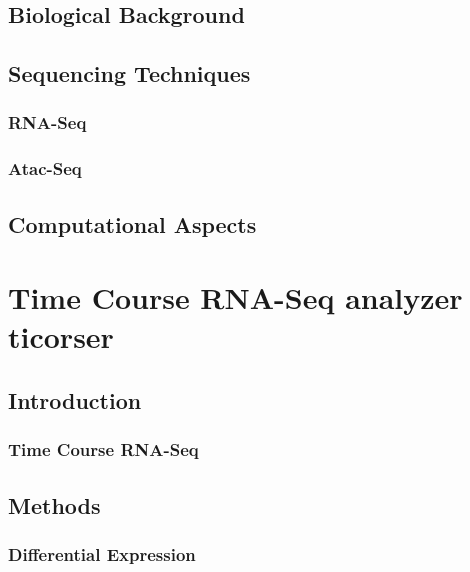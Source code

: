 \documentclass[b5paper,oneside,british,intoc,bibliograph=totoc,index=totoc,BCOR10mm,twoside,openright]{book}
\numberwithin{equation}{section}
\numberwithin{figure}{section}
\begin{document}
\section{Biological Background}


\section{Sequencing Techniques}
\subsection{RNA-Seq} \label{sec:rnaseq}

\subsection{Atac-Seq} \label{sec:atacseq}


\section{Computational Aspects}


\chapter{Time Course RNA-Seq analyzer \newline ticorser} \label{sec:ticorsecap}


\section{Introduction} \label{sec:ticorseintro}


\subsection{Time Course RNA-Seq} \label{sec:ticorsernaseq}

\section{Methods} \label{sec:ticorseintromethods}


\subsection{Differential Expression} \label{sec:ticorsemethods}

\end{document}
